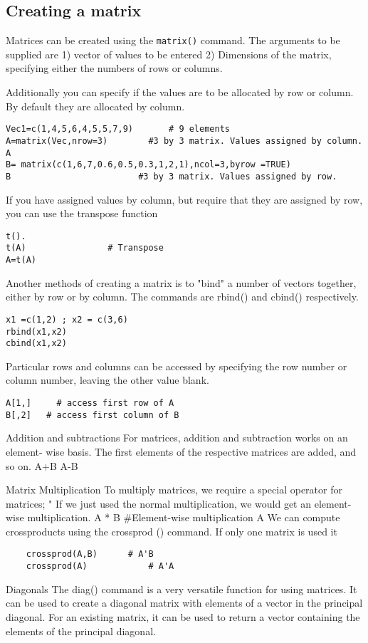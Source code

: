 \subsection{Creating a matrix}
Matrices can be created using the \texttt{matrix()} command. The arguments to be supplied are 1) vector of values to be entered
2) Dimensions of the matrix, specifying either the numbers of rows or columns.

Additionally you can specify if the values are to be allocated by row or column. By default they are allocated by column.
\begin{verbatim}
Vec1=c(1,4,5,6,4,5,5,7,9)		# 9 elements
A=matrix(Vec,nrow=3)		#3 by 3 matrix. Values assigned by column.
A
B= matrix(c(1,6,7,0.6,0.5,0.3,1,2,1),ncol=3,byrow =TRUE)
B				          #3 by 3 matrix. Values assigned by row.
\end{verbatim}	
If you have assigned values by column, but require that they are assigned by row, you can use the transpose function
\begin{verbatim}
t().
t(A)				# Transpose
A=t(A)	
\end{verbatim}

Another methods of creating a matrix is to "bind" a number of vectors together, either by row or by column. The commands are rbind() and cbind() respectively.
\begin{verbatim}
x1 =c(1,2) ; x2 = c(3,6)
rbind(x1,x2)
cbind(x1,x2)
\end{verbatim}




Particular rows and columns can be accessed by specifying the row number or column number, leaving the other value blank.
\begin{verbatim}
A[1,]	  # access first row of A
B[,2]   # access first column of B
\end{verbatim}
Addition and subtractions
For matrices, addition and subtraction works on an element- wise basis. The first elements of the respective matrices are added, and so on.
A+B
A-B

Matrix Multiplication
To multiply matrices, we require a special operator for matrices; "%
If we just used the normal multiplication, we would get an element-wise multiplication.
A * B  		#Element-wise multiplication
A %
We can compute crossproducts using the crossprod () command. If only one matrix is used it
\begin{framed}
	\begin{verbatim}
	crossprod(A,B) 		# A'B
	crossprod(A) 			# A'A
	\end{verbatim}
\end{framed}
Diagonals
The diag() command is a very versatile function for using matrices.
It can be used to create a diagonal matrix with elements of a vector in the principal diagonal. For an existing matrix, it can be used to return a vector containing the elements of the principal diagonal.


